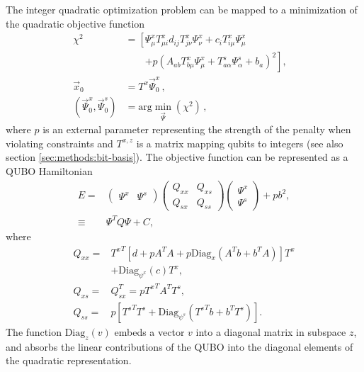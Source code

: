 \documentclass[prd,twocolumn,tightenlines,preprintnumbers,showpacs,superscriptaddress,notitlepage,nofootinbib,eqsecnum,floatfix,longbibliography,aps,10pt]{revtex4-2}
\begin{document}
The integer quadratic optimization problem can be mapped to a minimization of the quadratic objective function
\begin{align}
 \chi^2                         & = \left[\Psi^x_{\mu} T^x_{\mu i}d_{ij} T^x_{j \nu}\Psi^x_\nu + c_i T^x_{i\mu} \Psi^x_\mu \right.
 \nonumber                                                                                                                             \\ \label{eq:qubo-min}
                                & \qquad\left.+ p (A_{a b} T^x_{b \mu} \Psi^x_{\mu} + T^s_{a \alpha} \Psi^s_\alpha + b_a)^2 \right],   \\
 \vec x_0                       & =  T^x \vec \Psi^x_0 \, ,
 \\
 (\vec \Psi^x_0, \vec \Psi^s_0) & = \mathrm{arg}\min\limits_{\vec{\Psi}}(\chi^2) \,,                                                 &
\end{align}
where $p$ is an external parameter representing the strength of the penalty when violating constraints and $T^{x,z}$ is a matrix mapping qubits to integers (see also section \ref{sec:methods:bit-basis}).
The objective function can be represented as a QUBO Hamiltonian
\begin{align}
 E =    &
 \begin{pmatrix}
  \Psi^x & \Psi^s
 \end{pmatrix}
 \begin{pmatrix}
  Q_{xx} & Q_{xs} \\
  Q_{sx} & Q_{ss}
 \end{pmatrix}
 \begin{pmatrix}
  \Psi^x \\ \Psi^s
 \end{pmatrix} + pb^2, \\
 \equiv & \Psi^T Q \Psi + C,
 \label{eq:matrix_form}
\end{align}
where
\begin{align}
 Q_{xx} = & {T^{x}}^T \left[ d + p A^T A + p \mathrm{Diag}_{x} \left(A^T b + b^T A\right) \right] T^x \nonumber \\
          & + \mathrm{Diag}_{\psi^x}(c) T^x,                                                                    \\
 Q_{xs} = & Q_{sx}^T = p {T^{x}}^T A^T T^s,                                                                     \\
 Q_{ss} = & p\left[ {T^{s}}^T T^s + \mathrm{Diag}_{\psi^s}\left( {T^{s}}^T b + b^T T^s\right) \right].
\end{align}
The function $\mathrm{Diag}_{z}(v)$ embeds a vector $v$ into a diagonal matrix in subspace $z$, and absorbs the linear contributions of the QUBO into the diagonal elements of the quadratic representation.
\end{document}
